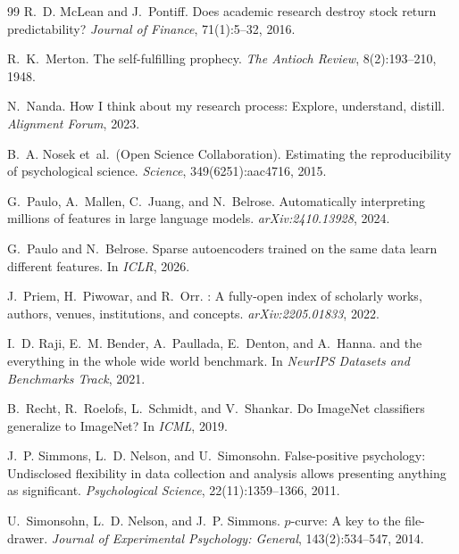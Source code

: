 \documentclass{article}
\begin{document}
\begin{thebibliography}{99}
R.~D. McLean and J.~Pontiff.
\newblock Does academic research destroy stock return predictability?
\newblock \emph{Journal of Finance}, 71(1):5--32, 2016.

R.~K.~Merton.
\newblock The self-fulfilling prophecy.
\newblock \emph{The Antioch Review}, 8(2):193--210, 1948.

N.~Nanda.
\newblock How {I} think about my research process: Explore, understand, distill.
\newblock \emph{Alignment Forum}, 2023.

B.~A. Nosek et~al.\ (Open Science Collaboration).
\newblock Estimating the reproducibility of psychological science.
\newblock \emph{Science}, 349(6251):aac4716, 2015.

G.~Paulo, A.~Mallen, C.~Juang, and N.~Belrose.
\newblock Automatically interpreting millions of features in large language models.
\newblock \emph{arXiv:2410.13928}, 2024.

G.~Paulo and N.~Belrose.
\newblock Sparse autoencoders trained on the same data learn different features.
\newblock In \emph{ICLR}, 2026.

J.~Priem, H.~Piwowar, and R.~Orr.
: A fully-open index of scholarly works, authors, venues, institutions, and concepts.
\newblock \emph{arXiv:2205.01833}, 2022.

I.~D. Raji, E.~M. Bender, A.~Paullada, E.~Denton, and A.~Hanna.
 and the everything in the whole wide world benchmark.
\newblock In \emph{NeurIPS Datasets and Benchmarks Track}, 2021.

B.~Recht, R.~Roelofs, L.~Schmidt, and V.~Shankar.
\newblock Do {ImageNet} classifiers generalize to {ImageNet}?
\newblock In \emph{ICML}, 2019.

J.~P. Simmons, L.~D. Nelson, and U.~Simonsohn.
\newblock False-positive psychology: Undisclosed flexibility in data collection and analysis allows presenting anything as significant.
\newblock \emph{Psychological Science}, 22(11):1359--1366, 2011.

U.~Simonsohn, L.~D. Nelson, and J.~P. Simmons.
\newblock $p$-curve: A key to the file-drawer.
\newblock \emph{Journal of Experimental Psychology: General}, 143(2):534--547, 2014.


\end{thebibliography}
\end{document}
